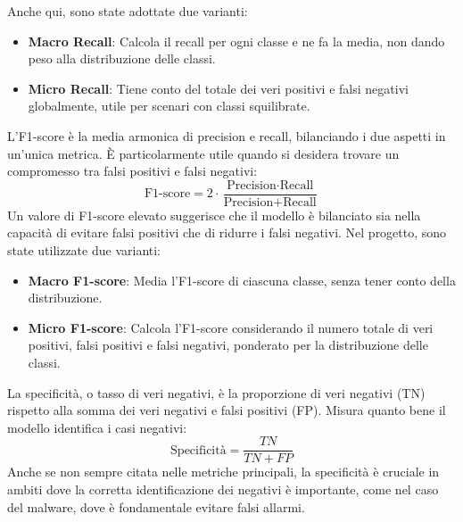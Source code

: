 Anche qui, sono state adottate due varianti:
\begin{itemize}
    \item \textbf{Macro Recall}: Calcola il recall per ogni classe e ne fa la media, non dando peso alla distribuzione delle classi.
    \item \textbf{Micro Recall}: Tiene conto del totale dei veri positivi e falsi negativi globalmente, utile per scenari con classi squilibrate.
\end{itemize}

L'F1-score è la media armonica di precision e recall, bilanciando i due aspetti in un'unica metrica. È particolarmente utile quando si desidera trovare un compromesso tra falsi positivi e falsi negativi:
\[
\text{F1-score} = 2 \cdot \frac{\text{Precision} \cdot \text{Recall}}{\text{Precision} + \text{Recall}}
\]
Un valore di F1-score elevato suggerisce che il modello è bilanciato sia nella capacità di evitare falsi positivi che di ridurre i falsi negativi. Nel progetto, sono state utilizzate due varianti:
\begin{itemize}
    \item \textbf{Macro F1-score}: Media l'F1-score di ciascuna classe, senza tener conto della distribuzione.
    \item \textbf{Micro F1-score}: Calcola l'F1-score considerando il numero totale di veri positivi, falsi positivi e falsi negativi, ponderato per la distribuzione delle classi.
\end{itemize}

La specificità, o tasso di veri negativi, è la proporzione di veri negativi (TN) rispetto alla somma dei veri negativi e falsi positivi (FP). Misura quanto bene il modello identifica i casi negativi:
\[
\text{Specificità} = \frac{TN}{TN + FP}
\]
Anche se non sempre citata nelle metriche principali, la specificità è cruciale in ambiti dove la corretta identificazione dei negativi è importante, come nel caso del malware, dove è fondamentale evitare falsi allarmi.

